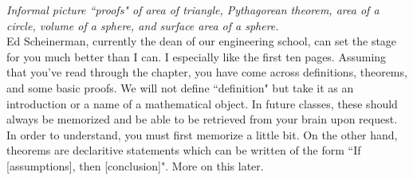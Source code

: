\documentclass[11pt]{article}
\theoremstyle{plain}
\theoremstyle{definition}
\theoremstyle{remark}
\begin{document}



{\it Informal picture ``proofs" of area of triangle, Pythagorean theorem, area of a circle, volume of a sphere, and surface area of a sphere.}\\

Ed Scheinerman, currently the dean of our engineering school, can set the stage for you much better than I can. I especially like the first ten pages. Assuming that you've read through the chapter, you have come across definitions, theorems, and some basic proofs. We will not define ``definition" but take it as an introduction or a name of a mathematical object. In future classes, these should always be memorized and be able to be retrieved from your brain upon request. In order to understand, you must first memorize a little bit. On the other hand, theorems are declaritive statements which can be written of the form ``If [assumptions], then [conclusion]". More on this later.
\end{document}
